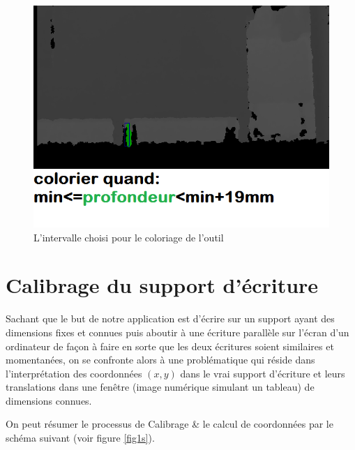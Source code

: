 \documentclass[12pt,a4paper,oneside]{book}
\begin{document}
	\begin{figure}[H]
		\centering
		\includegraphics[scale=0.5]{images/i5.png}
		\caption{L'intervalle choisi pour le coloriage de l'outil}
		\label{figd0}
	\end{figure}
	
	\section{Calibrage du support d'écriture}	
	Sachant que le but de notre  application est d'écrire sur un support ayant  des dimensions fixes et connues puis aboutir à une écriture  parallèle sur l'écran d'un ordinateur de façon à faire en sorte que les deux écritures soient similaires et momentanées, on se confronte alors à une problématique qui réside dans l'interprétation des coordonnées $(x,y)$ dans le vrai support d'écriture et leurs translations  dans une fenêtre (image numérique simulant un tableau)  de dimensions connues.
	
	On peut résumer le processus de Calibrage \& le calcul de coordonnées par le schéma suivant (voir figure \ref{fig1s}).
	
\end{document}
